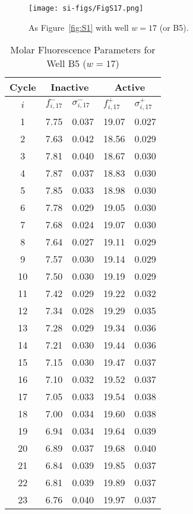                 \begin{figure}
                    \centering
                    \texttt{[image: si-figs/FigS17.png]}
                    \caption{
                        As Figure~\ref{fig:S1} with well $w=17$ (or B5).
                    }
                \end{figure}
                \clearpage
    \begin{table}
        \caption{Molar Fluorescence Parameters for Well B5 ($w=17$)}
        \centering
        \begin{tabular}{c|ll|ll}
            Cycle & \multicolumn{2}{c|}{Inactive} & \multicolumn{2}{c}{Active} \\
            \hline
            $i$ & $f_{i,17}^{-}$ & $\sigma_{i,17}^{-}$ &  $f_{i,17}^{+}$ & $\sigma_{i,17}^{+}$ \\
            \hline
    1 & 7.75 & 0.037 & 19.07 & 0.027 \\
2 & 7.63 & 0.042 & 18.56 & 0.029 \\
3 & 7.81 & 0.040 & 18.67 & 0.030 \\
4 & 7.87 & 0.037 & 18.83 & 0.030 \\
5 & 7.85 & 0.033 & 18.98 & 0.030 \\
6 & 7.78 & 0.029 & 19.05 & 0.030 \\
7 & 7.68 & 0.024 & 19.07 & 0.030 \\
8 & 7.64 & 0.027 & 19.11 & 0.029 \\
9 & 7.57 & 0.030 & 19.14 & 0.029 \\
10 & 7.50 & 0.030 & 19.19 & 0.029 \\
11 & 7.42 & 0.029 & 19.22 & 0.032 \\
12 & 7.34 & 0.028 & 19.29 & 0.035 \\
13 & 7.28 & 0.029 & 19.34 & 0.036 \\
14 & 7.21 & 0.030 & 19.44 & 0.036 \\
15 & 7.15 & 0.030 & 19.47 & 0.037 \\
16 & 7.10 & 0.032 & 19.52 & 0.037 \\
17 & 7.05 & 0.033 & 19.54 & 0.038 \\
18 & 7.00 & 0.034 & 19.60 & 0.038 \\
19 & 6.94 & 0.034 & 19.64 & 0.039 \\
20 & 6.89 & 0.037 & 19.68 & 0.040 \\
21 & 6.84 & 0.039 & 19.85 & 0.037 \\
22 & 6.81 & 0.039 & 19.89 & 0.037 \\
23 & 6.76 & 0.040 & 19.97 & 0.037 \\

\end{tabular}
\end{table}
